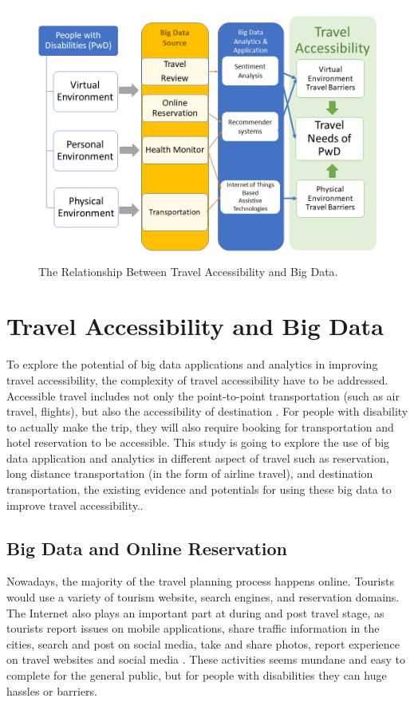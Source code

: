\begin{figure}[htb]
  \centering\includegraphics[width=\columnwidth]{images/present.png}
  \caption{The Relationship Between Travel Accessibility and Big Data.}\label{F:present}
\end{figure}


\section{Travel Accessibility and Big Data}
To explore the potential of big data applications and analytics in improving travel 
accessibility, the complexity of travel accessibility have to be addressed. 
Accessible travel includes not only the point-to-point transportation (such as air
travel, flights), but also the accessibility of destination \cite{Ama,DARCY2010816,milo}.
For people with disability to actually make the trip, they will also require booking for
transportation and hotel reservation to be accessible. This study is going to 
explore the use of big data application and analytics in different aspect of 
travel such as reservation, long distance 
transportation (in the form of airline travel), and destination transportation,
the existing evidence and potentials for using these big data to improve travel 
accessibility.. 

\subsection{Big Data and Online Reservation}
Nowadays, the majority of the travel planning process happens online. Tourists would
use a variety of tourism website, search engines, and reservation domains. The 
Internet also plays an important part at during and post travel stage, as tourists 
report issues on mobile applications, share traffic information in the cities, 
search and post on social media, take and share photos, report experience on 
travel websites and social media \cite{akerkar2012, Shafiee16}. These activities 
seems mundane and easy to complete for the general public, but for people with 
disabilities they can huge hassles or barriers.

